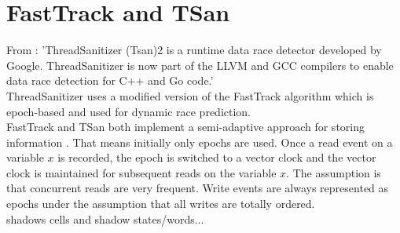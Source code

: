 \documentclass[12pt]{article}
\begin{document}
	\section{FastTrack and TSan}\label{fasttrack-sec}
	From \cite{lin}: 'ThreadSanitizer (Tsan)2 is a runtime data race detector developed by Google. ThreadSanitizer is now part of the LLVM and GCC compilers to enable data race detection for C++ and Go code.'\\
	ThreadSanitizer uses a modified version of the FastTrack algorithm which is epoch-based and used for dynamic race prediction.\\
	FastTrack and TSan both implement a semi-adaptive approach for storing information \cite[p. 10]{sulzmann2}. That means initially only epochs are used. Once a read event on a variable $x$ is recorded, the epoch is switched to a vector clock and the vector clock is maintained for subsequent reads on the variable $x$. The assumption is that concurrent reads are very frequent. Write events are always represented as epochs under the assumption that all writes are totally ordered.\\
	shadows cells and shadow states/words...
\end{document}
